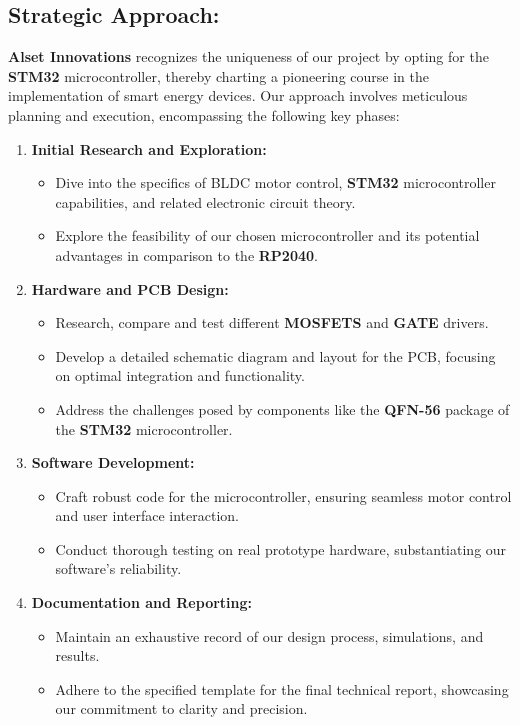 \subsection{Strategic Approach:}
\textbf{Alset Innovations} recognizes the uniqueness of our project by opting for the \textbf{STM32} microcontroller, thereby charting a pioneering course in the implementation of smart energy devices. Our approach involves meticulous planning and execution, encompassing the following key phases:

\begin{enumerate}
    \item \textbf{Initial Research and Exploration:}
        \begin{itemize}
            \item Dive into the specifics of BLDC motor control, \textbf{STM32} microcontroller capabilities, and related electronic circuit theory.
            \item Explore the feasibility of our chosen microcontroller and its potential advantages in comparison to the \textbf{RP2040}.
        \end{itemize}

    \item \textbf{Hardware and PCB Design:}
        \begin{itemize}
            \item Research, compare and test different \textbf{MOSFETS} and \textbf{GATE} drivers.
            \item Develop a detailed schematic diagram and layout for the PCB, focusing on optimal integration and functionality.
            \item Address the challenges posed by components like the \textbf{QFN-56} package of the \textbf{STM32} microcontroller.
        \end{itemize}

    \item \textbf{Software Development:}
        \begin{itemize}
            \item Craft robust code for the microcontroller, ensuring seamless motor control and user interface interaction.
            \item Conduct thorough testing on real prototype hardware, substantiating our software's reliability.
        \end{itemize}

    \item \textbf{Documentation and Reporting:}
        \begin{itemize}
            \item Maintain an exhaustive record of our design process, simulations, and results.
            \item Adhere to the specified template for the final technical report, showcasing our commitment to clarity and precision.
        \end{itemize}
\end{enumerate}

